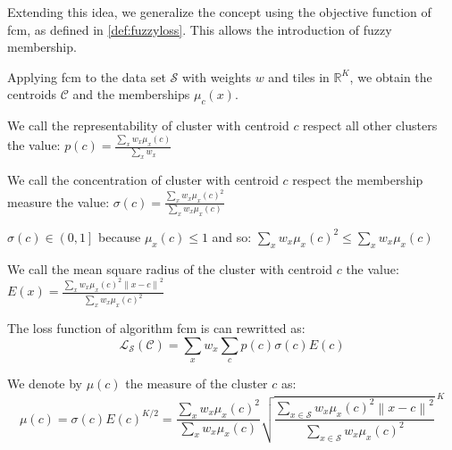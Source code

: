 \begin{modified}
\bigskip\noindent Extending this idea, we generalize the concept using the objective function of \gls{fcm}, as defined in \cref{def:fuzzyloss}. This allows the introduction of fuzzy membership.
\begin{definition}
\label{def:cluster_values}
	Applying \gls{fcm} to the data set $\mathcal{S}$ with weights $w$ and tiles in $\mathbb{R}^K$, we obtain the centroids $\mathcal{C}$ and the memberships $\mu_c(x)$.

	\noindent We call the representability of cluster with centroid $c$ respect all other clusters the value: $p(c) = \frac{\sum_x w_x\mu_x(c)}{\sum_x w_x}$

	\noindent We call the concentration of cluster with centroid $c$ respect the membership measure the value: $\sigma(c) = \frac{\sum_x w_x\mu_x(c)^2}{\sum_x w_x\mu_x(c)}$
	\begin{remark}
		$\sigma(c)\in\left(0,1\right]$ because $\mu_x(c)\leq1$ and so: $\sum_x w_x\mu_x(c)^2 \leq \sum_x w_x\mu_x(c)$
	\end{remark}

	\noindent We call the mean square radius of the cluster with centroid $c$ the value: \\$E(x) = \frac{\sum_x w_x\mu_x(c)^2\left\|x-c\right\|^2}{\sum_x w_x\mu_x(c)^2}$

	\noindent The loss function of algorithm \gls{fcm} is can rewritted as:
	\[
		\mathcal{L}_\mathcal{S}(\mathcal{C}) = \sum_x w_x\sum_c p(c)\sigma(c)E(c)
	\]

	\noindent We denote by $\mu(c)$ the measure of the cluster $c$ as:
	\begin{equation}
		\label{def:cluster_measure}
		\mu(c) = \sigma(c)E(c)^{K/2} = \frac{\sum_x w_x\mu_x(c)^2}{\sum_x w_x\mu_x(c)}{\sqrt{\frac{\sum_{x\in\mathcal{S}} w_x\mu_x(c)^2 \left\|x-c\right\|^2}{\sum_{x\in\mathcal{S}}w_x\mu_x(c)^2}}\,}^K
	\end{equation}
\end{definition}
\end{modified}

